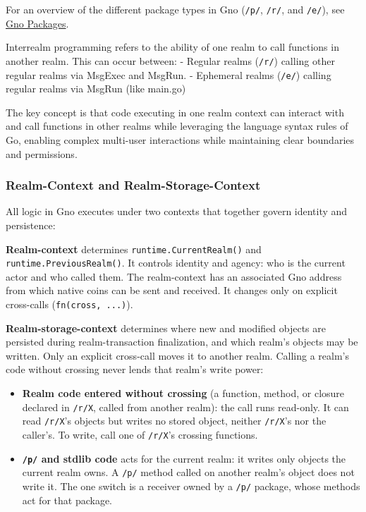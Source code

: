 \documentclass[12pt,a4paper]{article}
\newcommand{\passthrough}[1]{#1}
\begin{document}
For an overview of the different package types in Gno
(\passthrough{\lstinline!/p/!}, \passthrough{\lstinline!/r/!}, and
\passthrough{\lstinline!/e/!}), see
\href{../resources/gno-packages.md\#package-types}{Gno Packages}.

Interrealm programming refers to the ability of one realm to call
functions in another realm. This can occur between: - Regular realms
(\passthrough{\lstinline!/r/!}) calling other regular realms via MsgExec
and MsgRun. - Ephemeral realms (\passthrough{\lstinline!/e/!}) calling
regular realms via MsgRun (like main.go)

The key concept is that code executing in one realm context can interact
with and call functions in other realms while leveraging the language
syntax rules of Go, enabling complex multi-user interactions while
maintaining clear boundaries and permissions.

\subsubsection{Realm-Context and
Realm-Storage-Context}\label{realm-context-and-realm-storage-context}

All logic in Gno executes under two contexts that together govern
identity and persistence:

\textbf{Realm-context} determines
\passthrough{\lstinline!runtime.CurrentRealm()!} and
\passthrough{\lstinline!runtime.PreviousRealm()!}. It controls identity
and agency: who is the current actor and who called them. The
realm-context has an associated Gno address from which native coins can
be sent and received. It changes only on explicit cross-calls
(\passthrough{\lstinline!fn(cross, ...)!}).

\textbf{Realm-storage-context} determines where new and modified objects
are persisted during realm-transaction finalization, and which realm's
objects may be written. Only an explicit cross-call moves it to another
realm. Calling a realm's code without crossing never lends that realm's
write power:

\begin{itemize}
\item \textbf{Realm code entered without crossing} (a function, method,
or closure declared in \passthrough{\lstinline!/r/X!}, called from
another realm): the call runs read-only. It can read
\passthrough{\lstinline!/r/X!}'s objects but writes no stored object,
neither \passthrough{\lstinline!/r/X!}'s nor the caller's. To write,
call one of \passthrough{\lstinline!/r/X!}'s crossing functions.
\item \textbf{\passthrough{\lstinline!/p/!} and stdlib code} acts for
the current realm: it writes only objects the current realm owns. A
\passthrough{\lstinline!/p/!} method called on another realm's object
does not write it. The one switch is a receiver owned by a
\passthrough{\lstinline!/p/!} package, whose methods act for that
package.
\end{itemize}
\end{document}
